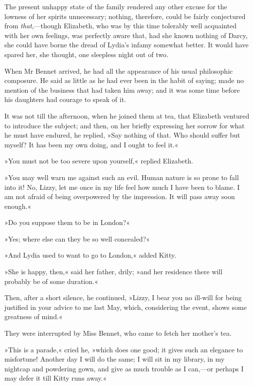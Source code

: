 The present unhappy state of the family rendered any other excuse for the lowness of her spirits unnecessary; nothing, therefore, could be fairly conjectured from \textit{that},—though Elizabeth, who was by this time tolerably well acquainted with her own feelings, was perfectly aware that, had she known nothing of Darcy, she could have borne the dread of Lydia's infamy somewhat better. It would have spared her, she thought, one sleepless night out of two.

When Mr Bennet arrived, he had all the appearance of his usual philosophic composure. He said as little as he had ever been in the habit of saying; made no mention of the business that had taken him away; and it was some time before his daughters had courage to speak of it.

It was not till the afternoon, when he joined them at tea, that Elizabeth ventured to introduce the subject; and then, on her briefly expressing her sorrow for what he must have endured, he replied, »Say nothing of that. Who should suffer but myself? It has been my own doing, and I ought to feel it.«

»You must not be too severe upon yourself,« replied Elizabeth.

»You may well warn me against such an evil. Human nature is so prone to fall into it! No, Lizzy, let me once in my life feel how much I have been to blame. I am not afraid of being overpowered by the impression. It will pass away soon enough.«

»Do you suppose them to be in London?«

»Yes; where else can they be so well concealed?«

»And Lydia used to want to go to London,« added Kitty.

»She is happy, then,« said her father, drily; »and her residence there will probably be of some duration.«

Then, after a short silence, he continued, »Lizzy, I bear you no ill-will for being justified in your advice to me last May, which, considering the event, shows some greatness of mind.«

They were interrupted by Miss Bennet, who came to fetch her mother's tea.

»This is a parade,« cried he, »which does one good; it gives such an elegance to misfortune! Another day I will do the same; I will sit in my library, in my nightcap and powdering gown, and give as much trouble as I can,—or perhaps I may defer it till Kitty runs away.«

